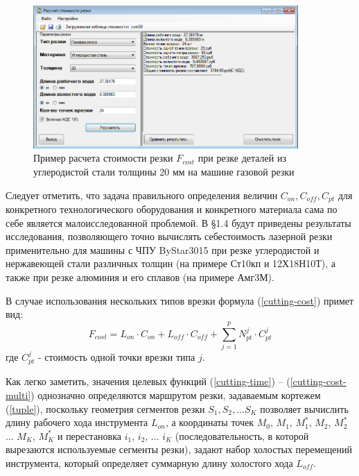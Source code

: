 \documentclass[12pt]{report}
\begin{document}
\begin{figure}
  \begin{center}
  \includegraphics[width=0.9\textwidth]{cost.png}
  \caption{Пример расчета стоимости резки $F_{cost}$ при резке деталей из углеродистой стали толщины 20 мм на машине газовой резки}
  \label{cost}
  \end{center}
\end{figure}

Следует отметить,
что задача правильного определения величин
$C_{on}, C_{off}, C_{pt}$
для конкретного технологического оборудования
и конкретного материала сама по себе является малоисследованной проблемой.
В \S 1.4
будут приведены результаты исследования,
позволяющего точно вычислять себестоимость
лазерной резки применительно для машины с ЧПУ
ByStar3015 при резке углеродистой и нержавеющей
стали различных толщин
(на примере Ст10кп и 12Х18Н10Т),
а также при резке алюминия и его сплавов (на примере Амг3М).

В случае использования нескольких типов врезки формула (\ref{cutting-cost}) примет вид:
\begin{equation}
  F_{cost}=
  L_{on} \cdot C_{on} +
  L_{off} \cdot C_{off} +
  \sum_{j=1}^p N_{pt}^j \cdot C_{pt}^j
  \label{cutting-cost-multi}
\end{equation}
где $C_{pt}^j$ - стоимость одной точки врезки типа $j$.

Как легко заметить,
значения целевых функций (\ref{cutting-time}) – (\ref{cutting-cost-multi})
однозначно определяются маршрутом резки, задаваемым кортежем (\ref{tuple}),
поскольку геометрия сегментов резки
$S_1, S_2, \dots S_K$
позволяет вычислить длину рабочего хода инструмента  $L_{on}$,
а координаты точек
$M_0$, $M_1$, $M_1^*$, $M_2$, $M_2^*$ ... $M_K$, $M_K^*$
и перестановка
$i_1$, $i_2$, ... $i_K$
(последовательность, в которой вырезаются используемые сегменты резки),
задают набор холостых перемещений инструмента,
который определяет суммарную длину холостого хода  $L_{off}$.
\end{document}
